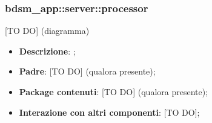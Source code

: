 


\subsubsection{bdsm\_app::server::processor} %
\label{ssub:bdsm_app_server_processor}
[TO DO] (diagramma) \newline \newline

\begin{itemize}
  \item \textbf{Descrizione}: ;
  \item \textbf{Padre}: [TO DO] (qualora presente);
  \item \textbf{Package contenuti}: [TO DO] (qualora presente);
  \item \textbf{Interazione con altri componenti}: [TO DO];
\end{itemize}
